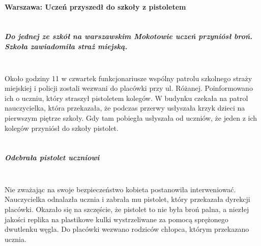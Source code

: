 \documentclass[a4paper]{article}
\begin{document}
\paragraph{\LARGE{Warszawa: Uczeń przyszedł do szkoły z pistoletem}}
\subparagraph{\\\Large{Do jednej ze szkół na warszawskim Mokotowie uczeń przyniósł broń. Szkoła zawiadomiła straż miejską.\\\\}}
\large{Około godziny 11 w czwartek funkcjonariusze wspólny patrolu szkolnego straży miejskiej i policji zostali wezwani do placówki przy ul. Różanej. Poinformowano ich o uczniu, który straszył pistoletem kolegów.
W budynku czekała na patrol nauczycielka, która przekazała, że podczas przerwy usłyszała krzyk dzieci na pierwszym piętrze szkoły. Gdy tam pobiegła usłyszała od uczniów, że jeden z ich kolegów przyniósł do szkoły pistolet.}
\subparagraph{\\\Large {Odebrała pistolet uczniowi\\\\}}
\large{Nie zważając na swoje bezpieczeństwo kobieta postanowiła interweniować. Nauczycielka odnalazła ucznia i zabrała mu pistolet, który przekazała dyrekcji placówki.
Okazało się na szczęście, że pistolet to nie była broń palna, a niezłej jakości replika na plastikowe kulki wystrzeliwane za pomocą sprężonego dwutlenku węgla.
Do placówki wezwano rodziców chłopca, którym przekazano ucznia.}
\end{document}
